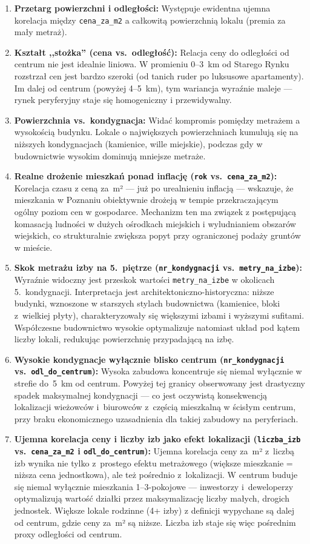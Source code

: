 \documentclass[12pt,a4paper]{article}
\begin{document}
\begin{enumerate}
  \item \textbf{Przetarg powierzchni i odległości:} Występuje ewidentna ujemna korelacja między \texttt{cena\_za\_m2} a całkowitą powierzchnią lokalu (premia za mały metraż).
  \item \textbf{Kształt ,,stożka'' (cena vs.\ odległość):} Relacja ceny do odległości od centrum nie jest idealnie liniowa. W promieniu 0--3~km od Starego Rynku rozstrzał cen jest bardzo szeroki (od tanich ruder po luksusowe apartamenty). Im dalej od centrum (powyżej 4--5~km), tym wariancja wyraźnie maleje --- rynek peryferyjny staje się homogeniczny i przewidywalny.
  \item \textbf{Powierzchnia vs.\ kondygnacja:} Widać kompromis pomiędzy metrażem a wysokością budynku. Lokale o największych powierzchniach kumulują się na niższych kondygnacjach (kamienice, wille miejskie), podczas gdy w budownictwie wysokim dominują mniejsze metraże.
  \item \textbf{Realne drożenie mieszkań ponad inflację (\texttt{rok} vs.\ \texttt{cena\_za\_m2}):} Korelacja czasu z ceną za~m² --- już po urealnieniu inflacją --- wskazuje, że mieszkania w Poznaniu obiektywnie drożeją w tempie przekraczającym ogólny poziom cen w gospodarce. Mechanizm ten ma związek z postępującą komasacją ludności w dużych ośrodkach miejskich i wyludnianiem obszarów wiejskich, co strukturalnie zwiększa popyt przy ograniczonej podaży gruntów w mieście.
  \item \textbf{Skok metrażu izby na 5.\ piętrze (\texttt{nr\_kondygnacji} vs.\ \texttt{metry\_na\_izbe}):} Wyraźnie widoczny jest przeskok wartości \texttt{metry\_na\_izbe} w okolicach 5.\ kondygnacji. Interpretacja jest architektoniczno-historyczna: niższe budynki, wznoszone w starszych stylach budownictwa (kamienice, bloki z~wielkiej płyty), charakteryzowały się większymi izbami i wyższymi sufitami. Współczesne budownictwo wysokie optymalizuje natomiast układ pod kątem liczby lokali, redukując powierzchnię przypadającą na izbę.
  \item \textbf{Wysokie kondygnacje wyłącznie blisko centrum (\texttt{nr\_kondygnacji} vs.\ \texttt{odl\_do\_centrum}):} Wysoka zabudowa koncentruje się niemal wyłącznie w strefie do~5~km od centrum. Powyżej tej granicy obserwowany jest drastyczny spadek maksymalnej kondygnacji --- co jest oczywistą konsekwencją lokalizacji wieżowców i~biurowców z~częścią mieszkalną w ścisłym centrum, przy braku ekonomicznego uzasadnienia dla takiej zabudowy na peryferiach.
  \item \textbf{Ujemna korelacja ceny i liczby izb jako efekt lokalizacji (\texttt{liczba\_izb} vs.\ \texttt{cena\_za\_m2} i \texttt{odl\_do\_centrum}):} Ujemna korelacja ceny za~m² z~liczbą izb wynika nie tylko z~prostego efektu metrażowego (większe mieszkanie = niższa cena jednostkowa), ale też pośrednio z~lokalizacji. W centrum buduje się niemal wyłącznie mieszkania 1--3-pokojowe --- inwestorzy i~deweloperzy optymalizują wartość działki przez maksymalizację liczby małych, drogich jednostek. Większe lokale rodzinne (4+ izby) z definicji wypychane są dalej od centrum, gdzie ceny za~m² są niższe. Liczba izb staje się więc pośrednim proxy odległości od centrum.
\end{enumerate}
\end{document}

